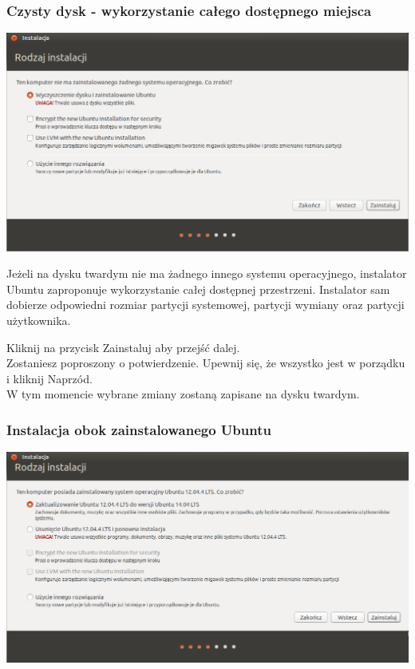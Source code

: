 \subsubsection{Czysty dysk - wykorzystanie całego dostępnego miejsca}
\begin{center}
        \includegraphics[width=\linewidth]{images/instalator_partycjonowanie_proste.png}
\end{center}

Jeżeli na dysku twardym nie ma żadnego innego systemu operacyjnego, instalator Ubuntu zaproponuje wykorzystanie całej dostępnej przestrzeni. Instalator sam dobierze odpowiedni rozmiar partycji systemowej, partycji wymiany oraz partycji użytkownika.
\begin{flushright}
Kliknij na przycisk \textcolor{ubuntu_orange}{Zainstaluj} aby przejść dalej.\\
Zostaniesz poproszony o potwierdzenie. Upewnij się, że wszystko jest w porządku i kliknij \textcolor{ubuntu_orange}{Naprzód}.\\
W tym momencie wybrane zmiany zostaną zapisane na dysku twardym.
\end{flushright}
\clearpage
\subsubsection{Instalacja obok zainstalowanego Ubuntu}
\begin{center}
        \includegraphics[width=\linewidth]{images/instalator_partycjonowanie_obok_ubuntu.png}
\end{center}

